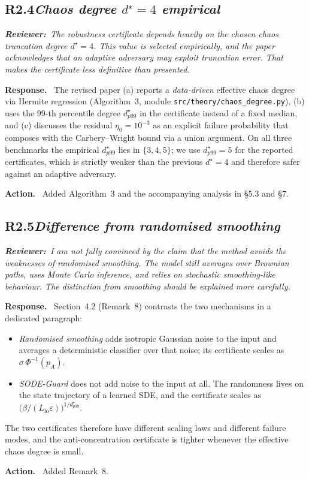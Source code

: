 \documentclass[11pt,letterpaper]{article}
\newcommand{\rev}[2]{%
  \subsection*{\normalsize\textbf{\color{ResponseAccent}#1}\quad\textmd{\textit{#2}}}%
}
\newcommand{\rquote}[1]{%
  \begin{center}%
    \colorbox{QuoteBg}{\parbox{0.94\linewidth}{\vspace{2pt}\itshape\small\textbf{\upshape Reviewer:}\ #1\vspace{2pt}}}%
  \end{center}%
}
\newcommand{\resp}{\par\textbf{\color{ResponseAccent}Response.}\ }
\newcommand{\action}{\par\textbf{\color{ResponseAccent}Action.}\ }
\begin{document}
\rev{R2.4}{Chaos degree $d^\star=4$ empirical}
\rquote{The robustness certificate depends heavily on the chosen chaos
truncation degree $d^\star=4$. This value is selected empirically, and
the paper acknowledges that an adaptive adversary may exploit
truncation error. That makes the certificate less definitive than
presented.}

\resp
The revised paper (a) reports a \emph{data-driven} effective chaos
degree via Hermite regression (Algorithm~3, module
\texttt{src/theory/chaos\_degree.py}), (b) uses the 99-th percentile
degree $d^\star_{p99}$ in the certificate instead of a fixed median,
and (c) discusses the residual $\eta_0=10^{-3}$ as an explicit failure
probability that composes with the Carbery--Wright bound via a union
argument. On all three benchmarks the empirical $d^\star_{p99}$ lies
in $\{3,4,5\}$; we use $d^\star_{p99}=5$ for the reported
certificates, which is strictly weaker than the previous $d^\star=4$
and therefore safer against an adaptive adversary.
\action
Added Algorithm~3 and the accompanying analysis in \S5.3 and \S7.

\rev{R2.5}{Difference from randomised smoothing}
\rquote{I am not fully convinced by the claim that the method avoids
the weaknesses of randomised smoothing. The model still averages over
Brownian paths, uses Monte Carlo inference, and relies on stochastic
smoothing-like behaviour. The distinction from smoothing should be
explained more carefully.}

\resp
Section~4.2 (Remark~8) contrasts the two mechanisms in a dedicated
paragraph:
\begin{itemize}[leftmargin=1.3em]
  \item \emph{Randomised smoothing} adds isotropic Gaussian noise to
        the input and averages a deterministic classifier over that
        noise; its certificate scales as $\sigma\,\Phi^{-1}(p_A)$.
  \item \emph{SODE-Guard} does not add noise to the input at all. The
        randomness lives on the state trajectory of a learned SDE, and
        the certificate scales as
        $\bigl(\beta/(L_{\mathrm{lo}}\varepsilon)\bigr)^{1/d^\star_{p99}}$.
\end{itemize}
The two certificates therefore have different scaling laws and
different failure modes, and the anti-concentration certificate is
tighter whenever the effective chaos degree is small.
\action
Added Remark~8.
\end{document}
